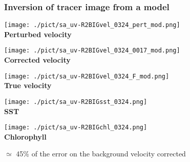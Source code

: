 \documentclass[compress,slidescentered,notes=show]{beamer}
\begin{document}
\begin{frame}
  \frametitle{Inversion of tracer image from a model}
\begin{minipage}{0.3\textwidth}
\begin{center}
\texttt{[image: ./pict/sa\_uv-R2BIGvel\_0324\_pert\_mod.png]}\\
{\small \bf Perturbed velocity}
\end{center}
\end{minipage}
\begin{minipage}{0.3\textwidth}
\begin{center}
\texttt{[image: ./pict/sa\_uv-R2BIGvel\_0324\_0017\_mod.png]}\\
{\small \bf Corrected velocity}
\end{center}
\end{minipage}
\begin{minipage}{0.3\textwidth}
\begin{center}
\texttt{[image: ./pict/sa\_uv-R2BIGvel\_0324\_F\_mod.png]}\\

{\small \bf True velocity}
\end{center}
\end{minipage}
\begin{minipage}{0.34\textwidth}
\begin{center}
\texttt{[image: ./pict/sa\_uv-R2BIGsst\_0324.png]}\\
{\small \bf SST}
\end{center}
\end{minipage}
\begin{minipage}{0.34\textwidth}
\begin{center}
\texttt{[image: ./pict/sa\_uv-R2BIGchl\_0324.png]}\\
{\small \bf Chlorophyll}
\end{center}
\end{minipage}
\begin{minipage}{0.3\textwidth}
\begin{block}{}
$\simeq$ 45\% of the error on the background velocity corrected
\end{block}
\end{minipage}

\end{frame}
\end{document}

